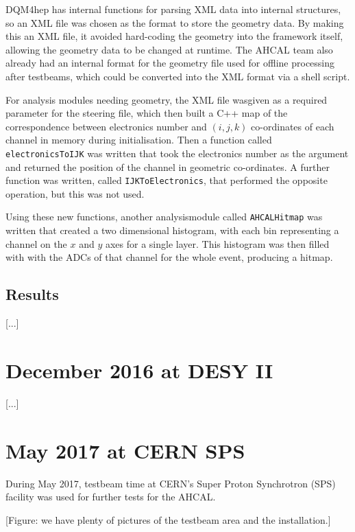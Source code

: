 DQM4hep has internal functions for parsing XML data into internal structures, so an XML file was chosen as the format to store the geometry data. By making this an XML file, it avoided hard-coding the geometry into the framework itself, allowing the geometry data to be changed at runtime. The AHCAL team also already had an internal format for the geometry file used for offline processing after testbeams, which could be converted into the XML format via a shell script.

For analysis modules needing geometry, the XML file wasgiven as a required parameter for the steering file, which then built a C++ map of the correspondence between electronics number and $(i,j,k)$ co-ordinates of each channel in memory during initialisation. Then a function called \texttt{electronicsToIJK} was written that took the electronics number as the argument and returned the position of the channel in geometric co-ordinates. A further function was written, called \texttt{IJKToElectronics}, that performed the opposite operation, but this was not used. 

Using these new functions, another analysismodule called \texttt{AHCALHitmap} was written that created a two dimensional histogram, with each bin representing a channel on the $x$ and $y$ axes for a single layer. This histogram was then filled with with the ADCs of that channel for the whole event, producing a hitmap.

\subsection{Results}
[...]

\section{December 2016 at DESY II} %
[...]

\section{May 2017 at CERN SPS} %

During May 2017, testbeam time at CERN's Super Proton Synchrotron (SPS) facility was used for further tests for the AHCAL.

\begin{center}
	[Figure: we have plenty of pictures of the testbeam area and the installation.]
\end{center}

